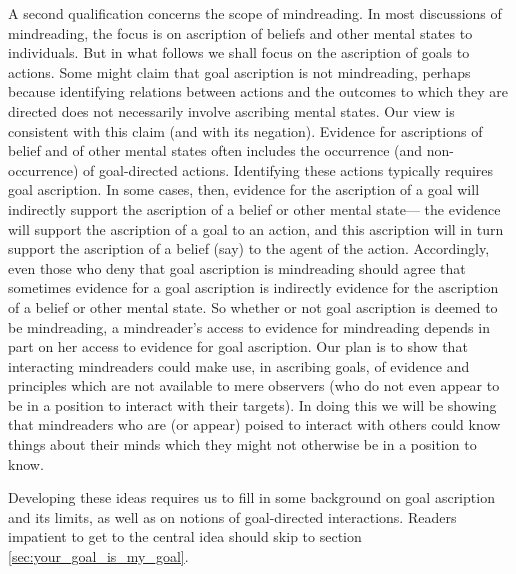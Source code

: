 \documentclass[14pt,a4paper]{extarticle}
\begin{document}
A second qualification concerns the scope of mindreading.
In most discussions of mindreading, the focus is on  ascription of beliefs and other mental states to individuals.
But in what follows we shall focus on the ascription of goals to actions.
Some might claim that goal ascription is not mindreading, perhaps because 
identifying relations between actions and the outcomes to which they are directed
does not necessarily involve ascribing mental states.
Our view is consistent with this claim (and with its negation).
\label{goal_ascription_verify}
Evidence for ascriptions of belief and of other mental states often includes the occurrence (and non-occurrence) of goal-directed actions.
Identifying these actions typically requires goal ascription.
In some cases, then, 
evidence for the ascription of a goal
will indirectly support the ascription of a belief or other mental state---%
the evidence will support the ascription of a goal to an action,
and this ascription will in turn support the ascription of a belief (say) to the agent of the action.
Accordingly, even those who deny that goal ascription is mindreading should agree that sometimes evidence for a goal ascription is indirectly evidence for the ascription of a belief or other mental state.
So whether or not goal ascription is deemed to be mindreading,
a mindreader's access to evidence for mindreading  depends in part on her access to evidence for goal ascription.
Our plan is to show that interacting mindreaders could make use, in ascribing goals, of evidence and principles which are not available to mere observers (who do not even appear to be in a position to interact with their targets).
In doing this we will be showing that
mindreaders who are (or appear) poised to interact with others 
could know things about their minds 
which they might not otherwise be in a position to know.


Developing these ideas requires us to fill in some background on goal ascription and its limits, as well as on notions of goal-directed interactions.
Readers impatient to get to the central idea should skip to section \vref{sec:your_goal_is_my_goal}.
\end{document}
